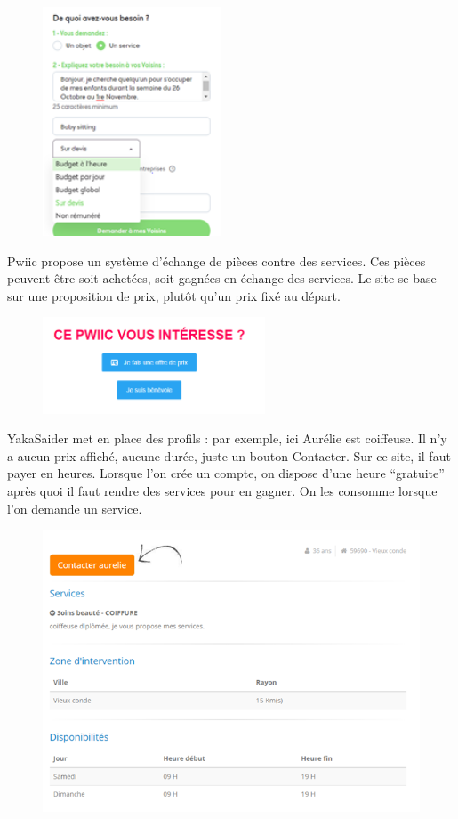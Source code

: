 \documentclass[a4paper,11pt]{article}
\begin{document}
\begin{figure}[H]
  \includegraphics[width=200px]{images/services-allovoisins.png}
  \label{fig:services-allovoisins}
\end{figure}

Pwiic propose un système d’échange de pièces contre des services. Ces pièces peuvent être soit achetées,
soit gagnées en échange des services. Le site se base sur une proposition de prix, plutôt qu’un prix fixé au départ.\\

\begin{figure}[H]
  \includegraphics[width=250px]{images/pieces-pwiic.png}
  \label{fig:pieces-pwiic}
\end{figure}

YakaSaider met en place des profils : par exemple, ici Aurélie est coiffeuse. Il n’y a aucun prix affiché,
aucune durée, juste un bouton Contacter. Sur ce site, il faut payer en heures. Lorsque l’on crée un compte,
on dispose d’une heure “gratuite” après quoi il faut rendre des services pour en gagner.
On les consomme lorsque l’on demande un service.\\

\begin{figure}[H]
  \includegraphics[width=500px]{images/aurelie-yakasaider.png}
  \label{fig:aurelie-yakasaider}
\end{figure}
\end{document}
